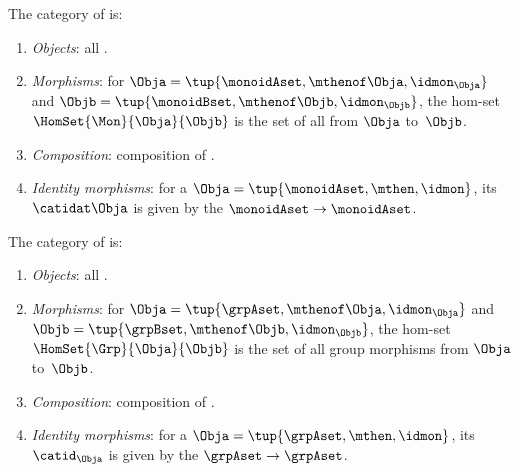 \begin{ctdefinition}
    \label{def:Mon}
    The category \Mon of  is:
    \begin{enumerate}
        \item \emph{Objects}: all .
        \item \emph{Morphisms}: for  $\Obja = \tup{\monoidAset, {{\mthenof \Obja}}, \idmon_\Obja}$ and $\Objb = \tup{\monoidBset, {{\mthenof \Objb}}, \idmon_\Objb}$, the hom-set $\HomSet{\Mon}{\Obja}{\Objb}$ is the set of all  from $\Obja$ to~$\Objb$.
        \item \emph{Composition}: composition of .
        \item \emph{Identity morphisms}: for a  $\Obja = \tup{\monoidAset, {\mthen}, \idmon}$, its  $\catidat\Obja$ is given by the  $\monoidAset \to \monoidAset$.
    \end{enumerate}
\end{ctdefinition}

\begin{ctdefinition}
    \label{def:Grp}
    The category \Grp of  is:
    \begin{enumerate}
        \item \emph{Objects}: all .
        \item \emph{Morphisms}: for  $\Obja = \tup{\grpAset, {\mthenof \Obja}, \idmon_\Obja}$ and $\Objb = \tup{\grpBset, {\mthenof \Objb}, \idmon_\Objb}$,  the hom-set $\HomSet{\Grp}{\Obja}{\Objb}$ is the set of all group morphisms from $\Obja$ to~$\Objb$.
        \item \emph{Composition}: composition of .
        \item \emph{Identity morphisms}: for a  $\Obja = \tup{\grpAset, {\mthen}, \idmon}$, its  $\catid_\Obja$ is given by the  $\grpAset \to \grpAset$.
    \end{enumerate}
\end{ctdefinition}
